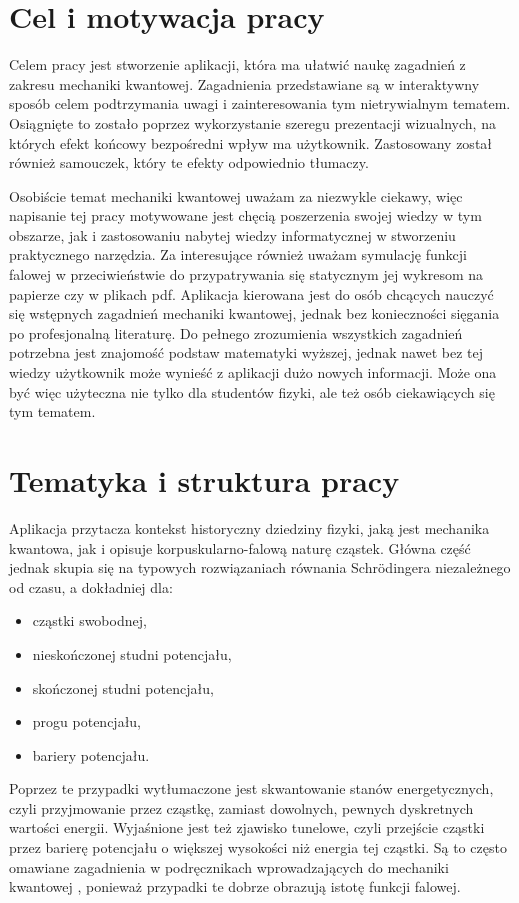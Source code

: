 \documentclass{SGGW-thesis}
\begin{document}
	\section{Cel i motywacja pracy}
	Celem pracy jest stworzenie aplikacji, która ma ułatwić naukę zagadnień z zakresu mechaniki kwantowej. Zagadnienia przedstawiane są w interaktywny sposób celem podtrzymania uwagi i zainteresowania tym nietrywialnym tematem. Osiągnięte to zostało poprzez wykorzystanie szeregu prezentacji wizualnych, na których efekt końcowy bezpośredni wpływ ma użytkownik. Zastosowany został również samouczek, który te efekty odpowiednio tłumaczy.
	
	Osobiście temat mechaniki kwantowej uważam za niezwykle ciekawy, więc napisanie tej pracy motywowane jest chęcią poszerzenia swojej wiedzy w tym obszarze, jak i zastosowaniu nabytej wiedzy informatycznej w stworzeniu praktycznego narzędzia. Za interesujące również uważam symulację funkcji falowej w przeciwieństwie do przypatrywania się statycznym jej wykresom na papierze czy w plikach pdf. Aplikacja kierowana jest do osób chcących nauczyć się wstępnych zagadnień mechaniki kwantowej, jednak bez konieczności sięgania po profesjonalną literaturę. Do pełnego zrozumienia wszystkich zagadnień potrzebna jest znajomość podstaw matematyki wyższej, jednak nawet bez tej wiedzy użytkownik może wynieść z aplikacji dużo nowych informacji. Może ona być więc użyteczna nie tylko dla studentów fizyki, ale też osób ciekawiących się tym tematem.
	\section{Tematyka i struktura pracy}
	Aplikacja przytacza kontekst historyczny dziedziny fizyki, jaką jest mechanika kwantowa, jak i opisuje korpuskularno-falową naturę cząstek. Główna część jednak skupia się na typowych rozwiązaniach równania Schrödingera niezależnego od czasu, a dokładniej dla:
	\begin{itemize}
	\item cząstki swobodnej,
	\item nieskończonej studni potencjału,
	\item skończonej studni potencjału,
	\item progu potencjału,
	\item bariery potencjału.
	\end{itemize}
	
	Poprzez te przypadki wytłumaczone jest skwantowanie stanów energetycznych, czyli przyjmowanie przez cząstkę, zamiast dowolnych, pewnych dyskretnych wartości energii. Wyjaśnione jest też zjawisko tunelowe, czyli przejście cząstki przez barierę potencjału o większej wysokości niż energia tej cząstki. Są to często omawiane zagadnienia w podręcznikach wprowadzających do mechaniki kwantowej \cite{fiz atom} \cite{mechanika kwant} \cite{fiz kwant}, ponieważ przypadki te dobrze obrazują istotę funkcji falowej.
	
\end{document}
